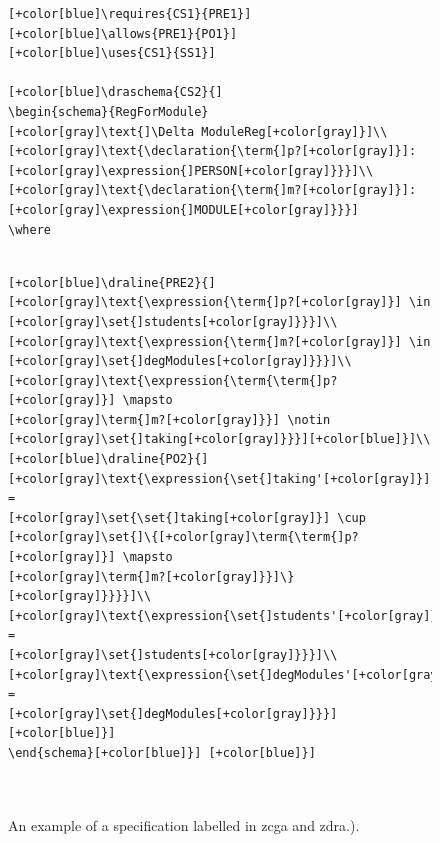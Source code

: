 \begin{figure}[H]
\begin{minipage}{0.45\textwidth}
\begin{tiny}
\begin{BVerbatim}[commandchars=+\[\]]
[+color[blue]\requires{CS1}{PRE1}] [+color[blue]\allows{PRE1}{PO1}]
[+color[blue]\uses{CS1}{SS1}]

[+color[blue]\draschema{CS2}{]
\begin{schema}{RegForModule}
[+color[gray]\text{]\Delta ModuleReg[+color[gray]}]\\
[+color[gray]\text{\declaration{\term{]p?[+color[gray]}]:
[+color[gray]\expression{]PERSON[+color[gray]}}}]\\
[+color[gray]\text{\declaration{\term{]m?[+color[gray]}]:
[+color[gray]\expression{]MODULE[+color[gray]}}}]
\where


\end{BVerbatim}
\end{tiny}
\caption{An example of a specification labelled in \gls{zcga} and \gls{zdra}.).\label{fig:zdrazcgaAno}}
\end{minipage}\hfill
\begin{minipage}{0.45\textwidth}
\centering
\begin{tiny}
\begin{BVerbatim}[commandchars=+\[\]]
[+color[blue]\draline{PRE2}{]
[+color[gray]\text{\expression{\term{]p?[+color[gray]}] \in
[+color[gray]\set{]students[+color[gray]}}}]\\
[+color[gray]\text{\expression{\term{]m?[+color[gray]}] \in
[+color[gray]\set{]degModules[+color[gray]}}}]\\
[+color[gray]\text{\expression{\term{\term{]p?[+color[gray]}] \mapsto
[+color[gray]\term{]m?[+color[gray]}}] \notin
[+color[gray]\set{]taking[+color[gray]}}}][+color[blue]}]\\
[+color[blue]\draline{PO2}{]
[+color[gray]\text{\expression{\set{]taking'[+color[gray]}] =
[+color[gray]\set{\set{]taking[+color[gray]}] \cup
[+color[gray]\set{]\{[+color[gray]\term{\term{]p?[+color[gray]}] \mapsto
[+color[gray]\term{]m?[+color[gray]}}]\}[+color[gray]}}}}]\\
[+color[gray]\text{\expression{\set{]students'[+color[gray]}] =
[+color[gray]\set{]students[+color[gray]}}}]\\
[+color[gray]\text{\expression{\set{]degModules'[+color[gray]}] =
[+color[gray]\set{]degModules[+color[gray]}}}][+color[blue]}]
\end{schema}[+color[blue]}] [+color[blue]}]



\end{BVerbatim}
\end{tiny}
\end{minipage}
\end{figure}
